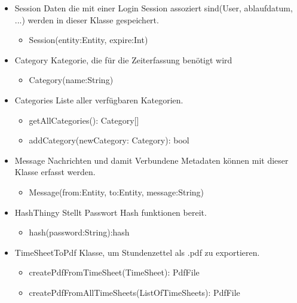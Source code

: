 \begin{itemize}
            \item{Session}
                Daten die mit einer Login Session assoziert sind(User, ablaufdatum, ...) werden in dieser Klasse gespeichert.
                \begin{itemize}
                    \item{Session(entity:Entity, expire:Int)}
                \end{itemize}

            \item{Category}
                Kategorie, die für die Zeiterfassung benötigt wird
                \begin{itemize}
                    \item{Category(name:String)}
                \end{itemize}

            \item{Categories}
                Liste aller verfügbaren Kategorien.
                \begin{itemize}
                   \item{getAllCategories(): Category[]}
                   \item{addCategory(newCategory: Category): bool}
                \end{itemize}

            \item{Message}
                Nachrichten und damit Verbundene Metadaten können mit dieser Klasse erfasst werden.
                \begin{itemize}
                    \item{Message(from:Entity, to:Entity, message:String)}
                \end{itemize}

            \item{HashThingy}
                Stellt Passwort Hash funktionen bereit.
                \begin{itemize}
                    \item{hash(password:String):hash}
                \end{itemize}

            \item{TimeSheetToPdf}
                Klasse, um Stundenzettel als .pdf zu exportieren.
                \begin{itemize}
                    \item{createPdfFromTimeSheet(TimeSheet): PdfFile}
                    \item{createPdfFromAllTimeSheets(ListOfTimeSheets): PdfFile}
                \end{itemize}

        \end{itemize}

